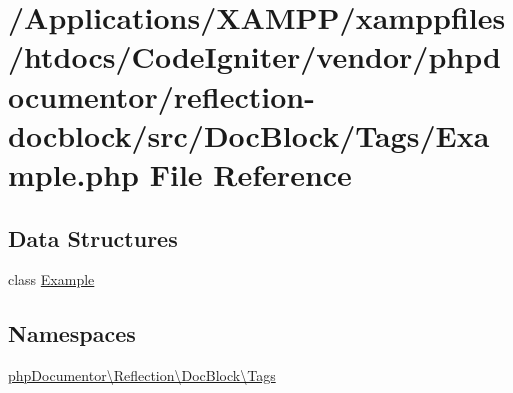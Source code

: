 \hypertarget{phpdocumentor_2reflection-docblock_2src_2_doc_block_2_tags_2_example_8php}{}\section{/\+Applications/\+X\+A\+M\+P\+P/xamppfiles/htdocs/\+Code\+Igniter/vendor/phpdocumentor/reflection-\/docblock/src/\+Doc\+Block/\+Tags/\+Example.php File Reference}
\label{phpdocumentor_2reflection-docblock_2src_2_doc_block_2_tags_2_example_8php}
\subsection*{Data Structures}
\begin{DoxyCompactItemize}
\item 
class \mbox{\hyperlink{classphp_documentor_1_1_reflection_1_1_doc_block_1_1_tags_1_1_example}{Example}}
\end{DoxyCompactItemize}
\subsection*{Namespaces}
\begin{DoxyCompactItemize}
\item 
 \mbox{\hyperlink{namespacephp_documentor_1_1_reflection_1_1_doc_block_1_1_tags}{php\+Documentor\textbackslash{}\+Reflection\textbackslash{}\+Doc\+Block\textbackslash{}\+Tags}}
\end{DoxyCompactItemize}

